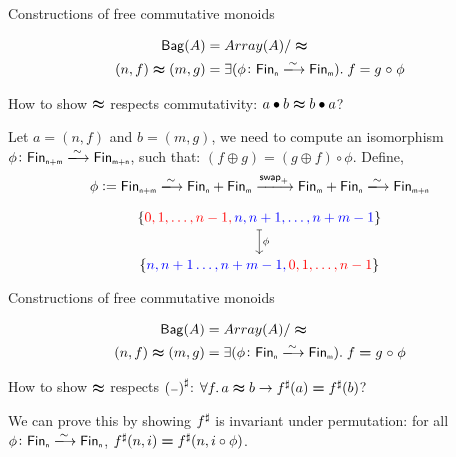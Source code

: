 \documentclass[9pt]{beamer}
\begin{document}
\begin{frame}[fragile]{Constructions of free commutative monoids}
    \begin{dblock}[Bags]
        \vspace{-0.4cm}
        \begin{align*}
            \type{Bag}(A) &= Array(A) / \reln
            \\
            (n,f) \reln (m,g) &= 
                \exis{\phi\colon \Fin[n]\xto{\sim}\Fin[m]}{f = g \comp \phi}
        \end{align*}
    \end{dblock}
    How to show $\mathrel{\boldsymbol{\approx}}$ respects \alert{commutativity}: $a \bullet b \mathrel{\boldsymbol{\approx}} b \bullet a$?

    Let $a = (n , f)$ and $b = (m , g)$, we need to compute an isomorphism $\phi\colon \Fin[n+m]\xto{\sim}\Fin[m+n]$,
    such that: $(f \oplus g) = (g \oplus f) \circ \phi$.
    Define,
    \begin{align*}
        \phi := \Fin[n+m] \xto{\sim} \Fin[n] + \Fin[m] \xto{\term{swap}_{+}} \Fin[m] + \Fin[n] \xto{\sim} \Fin[m+n] \\
    \end{align*}
    \vspace{-1cm}


\[
\begin{tikzcd}[ampersand replacement=\&,cramped]
	{\{\color{red}0,1,\dots,n-1, \color{blue} n,n+1,\dots,n+m-1 \color{black}\}} \\
	{ \{\color{blue}n,n+1\dots,n+m-1, \color{red}0,1,\dots,n-1 \color{black}\}}
    \arrow["\phi", maps to, from=1-1, to=2-1]
\end{tikzcd}\]
    
\end{frame}

\begin{frame}[fragile]{Constructions of free commutative monoids}
    \begin{dblock}[Bags]
        \vspace{-0.4cm}
        \begin{align*}
            \type{Bag}(A) &= Array(A) / \reln
            \\
            (n,f) \reln (m,g) &= 
                \exis{\phi\colon \Fin[n]\xto{\sim}\Fin[m]}{f \id g \comp \phi}
        \end{align*}
    \end{dblock}
    How to show $\mathrel{\boldsymbol{\approx}}$ respects ${({\scriptstyle{-}})}^{\sharp}$: $\forall f. \, a \reln b \to \ext{f}(a) \id \ext{f}(b)$?

    We can prove this by showing ${f}^{\sharp}$ is \alert{invariant under permutation}: for all $\phi\colon \Fin[n]\xto{\sim}\Fin[n]$,
    $\ext{f}(n, i) \id \ext{f}(n, i \circ \phi)$.
    
\end{frame}
\end{document}
